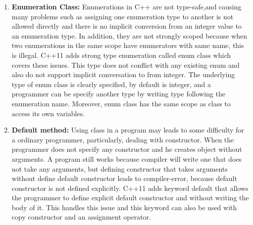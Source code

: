 \documentclass[11pt]{report}
\begin{document}
\begin{enumerate}
\item  \textbf{Enumeration Class:} Enumerations in C++ are not type-safe,\linebreak and causing many problems such as assigning one enumeration type to another is not allowed directly and there is no implicit conversion from an integer value to an enumeration type. In addition, they are not strongly scoped because when two enumerations in the same scope have \linebreak enumerators with same name, this is illegal. C++11 adds strong type enumeration called enum class which covers these issues. This type does not conflict with any existing enum and also do not support implicit \linebreak conversation to from integer. The underlying type of enum class is clearly specified, by default is integer, and a programmer can be specify another type by writing type following the enumeration name. Moreover, enum class has the same scope as class to access its own variables\cite{Gregorie:professionalcpp}.
\newpage
\item \textbf{Default method:} Using class in a program may leads to some \linebreak difficulty for a ordinary programmer, particularly, dealing with \linebreak constructor. When the programmer does not specify any constructor and he creates object without arguments. A program still works \linebreak because compiler will write one that does not take any arguments, but \linebreak defining \linebreak constructor that takes arguments without define default constructor leads to compiler-error, because default constructor is not defined explicitly. C++11 adds keyword default that allows the programmer to define \linebreak explicit default constructor and without writing the body of it. This \linebreak handles this issue and this keyword can also be used with copy \linebreak constructor and an assignment operator\cite{Gregorie:professionalcpp}. 


\end{enumerate}
\end{document}
